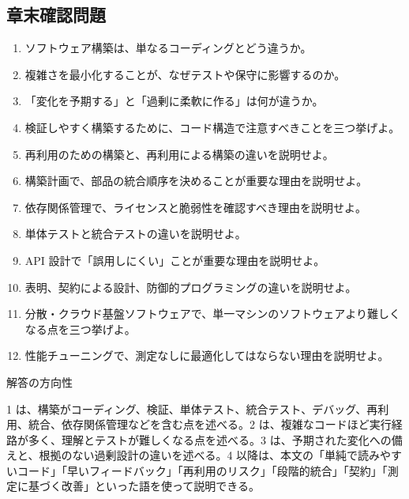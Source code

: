 \subsection{章末確認問題}

\begin{enumerate}
  \item ソフトウェア構築は、単なるコーディングとどう違うか。
  \item 複雑さを最小化することが、なぜテストや保守に影響するのか。
  \item 「変化を予期する」と「過剰に柔軟に作る」は何が違うか。
  \item 検証しやすく構築するために、コード構造で注意すべきことを三つ挙げよ。
  \item 再利用のための構築と、再利用による構築の違いを説明せよ。
  \item 構築計画で、部品の統合順序を決めることが重要な理由を説明せよ。
  \item 依存関係管理で、ライセンスと脆弱性を確認すべき理由を説明せよ。
  \item 単体テストと統合テストの違いを説明せよ。
  \item API 設計で「誤用しにくい」ことが重要な理由を説明せよ。
  \item 表明、契約による設計、防御的プログラミングの違いを説明せよ。
  \item 分散・クラウド基盤ソフトウェアで、単一マシンのソフトウェアより難しくなる点を三つ挙げよ。
  \item 性能チューニングで、測定なしに最適化してはならない理由を説明せよ。
\end{enumerate}

\begin{plainbox}
解答の方向性

1 は、構築がコーディング、検証、単体テスト、統合テスト、デバッグ、再利用、統合、依存関係管理などを含む点を述べる。2 は、複雑なコードほど実行経路が多く、理解とテストが難しくなる点を述べる。3 は、予期された変化への備えと、根拠のない過剰設計の違いを述べる。4 以降は、本文の「単純で読みやすいコード」「早いフィードバック」「再利用のリスク」「段階的統合」「契約」「測定に基づく改善」といった語を使って説明できる。
\end{plainbox}
